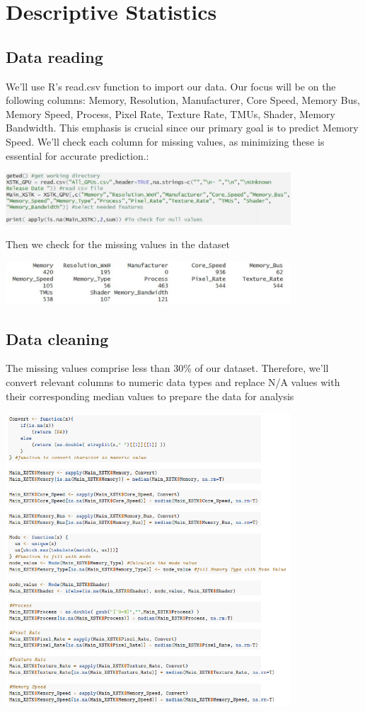 \section{Descriptive Statistics}
\subsection{Data reading}
\tab We'll use R's read.csv function to import our data. Our focus will be on the following columns: Memory, Resolution, Manufacturer, Core Speed, Memory Bus, Memory Speed, Process, Pixel Rate, Texture Rate, TMUs, Shader, Memory Bandwidth. This emphasis is crucial since our primary goal is to predict Memory Speed.  We'll check each column for missing values, as minimizing these is essential for accurate prediction.:
\begin{center}
    \includegraphics[width=0.8\textwidth]{Read_Data.png}
\end{center}
\tab Then we check for the missing values in the dataset
\begin{center}
    \includegraphics[width=0.8\textwidth]{Checknull.png}
\end{center}
\subsection{Data cleaning}
\tab The missing values comprise less than 30\% of our dataset. Therefore, we'll convert relevant columns to numeric data types and replace N/A values with their corresponding median values to prepare the data for analysis
\begin{center}
    \includegraphics[width=0.8\textwidth]{cleaning.png}
\end{center}

